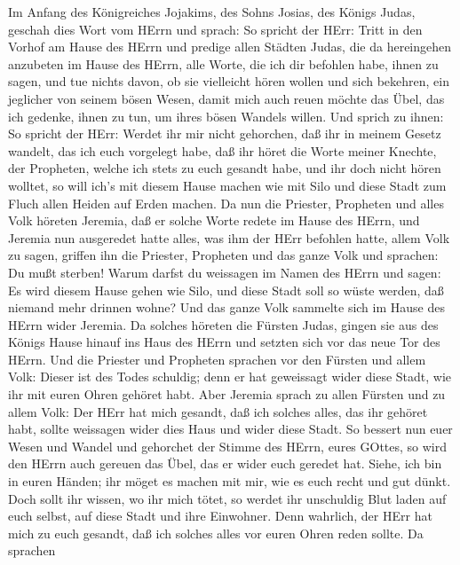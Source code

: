  Im Anfang des Königreiches Jojakims, des Sohns Josias, des
Königs Judas, geschah dies Wort vom HErrn und sprach:  So
spricht der HErr: Tritt in den Vorhof am Hause des HErrn und predige
allen Städten Judas, die da hereingehen anzubeten im Hause des HErrn,
alle Worte, die ich dir befohlen habe, ihnen zu sagen, und tue nichts
davon,  ob sie vielleicht hören wollen und sich bekehren,
ein jeglicher von seinem bösen Wesen, damit mich auch reuen möchte das
Übel, das ich gedenke, ihnen zu tun, um ihres bösen Wandels willen.
 Und sprich zu ihnen: So spricht der HErr: Werdet ihr mir
nicht gehorchen, daß ihr in meinem Gesetz wandelt, das ich euch
vorgelegt habe,  daß ihr höret die Worte meiner Knechte, der
Propheten, welche ich stets zu euch gesandt habe, und ihr doch nicht
hören wolltet,  so will ich's mit diesem Hause machen wie
mit Silo und diese Stadt zum Fluch allen Heiden auf Erden machen.
 Da nun die Priester, Propheten und alles Volk höreten
Jeremia, daß er solche Worte redete im Hause des HErrn,  und
Jeremia nun ausgeredet hatte alles, was ihm der HErr befohlen hatte,
allem Volk zu sagen, griffen ihn die Priester, Propheten und das ganze
Volk und sprachen: Du mußt sterben!  Warum darfst du
weissagen im Namen des HErrn und sagen: Es wird diesem Hause gehen wie
Silo, und diese Stadt soll so wüste werden, daß niemand mehr drinnen
wohne? Und das ganze Volk sammelte sich im Hause des HErrn wider
Jeremia.  Da solches höreten die Fürsten Judas, gingen sie
aus des Königs Hause hinauf ins Haus des HErrn und setzten sich vor das
neue Tor des HErrn.  Und die Priester und Propheten
sprachen vor den Fürsten und allem Volk: Dieser ist des Todes schuldig;
denn er hat geweissagt wider diese Stadt, wie ihr mit euren Ohren
gehöret habt.  Aber Jeremia sprach zu allen Fürsten und zu
allem Volk: Der HErr hat mich gesandt, daß ich solches alles, das ihr
gehöret habt, sollte weissagen wider dies Haus und wider diese Stadt.
 So bessert nun euer Wesen und Wandel und gehorchet der
Stimme des HErrn, eures GOttes, so wird den HErrn auch gereuen das Übel,
das er wider euch geredet hat.  Siehe, ich bin in euren
Händen; ihr möget es machen mit mir, wie es euch recht und gut dünkt.
 Doch sollt ihr wissen, wo ihr mich tötet, so werdet ihr
unschuldig Blut laden auf euch selbst, auf diese Stadt und ihre
Einwohner. Denn wahrlich, der HErr hat mich zu euch gesandt, daß ich
solches alles vor euren Ohren reden sollte.  Da sprachen
